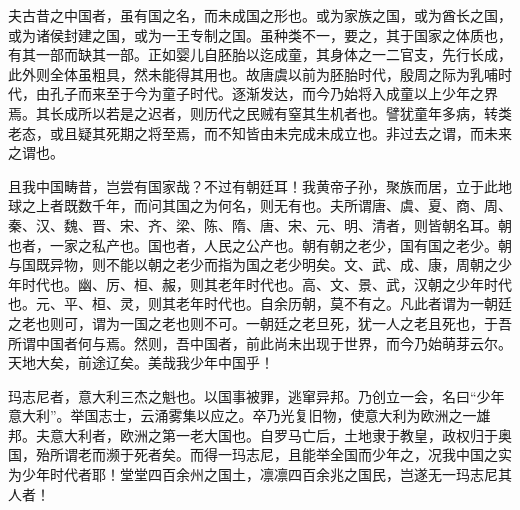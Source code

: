 \documentclass[UTF8,titlepage,oneside]{ctexbook}
\begin{document}
夫古昔之中国者，虽有国之名，而未成国之形也。或为家族之国，或为酋长之国，或为诸侯封建之国，或为一王专制之国。虽种类不一，要之，其于国家之体质也，有其一部而缺其一部。正如婴儿自胚胎以迄成童，其身体之一二官支，先行长成，此外则全体虽粗具，然未能得其用也。故唐虞以前为胚胎时代，殷周之际为乳哺时代，由孔子而来至于今为童子时代。逐渐发达，而今乃始将入成童以上少年之界焉。其长成所以若是之迟者，则历代之民贼有窒其生机者也。譬犹童年多病，转类老态，或且疑其死期之将至焉，而不知皆由未完成未成立也。非过去之谓，而未来之谓也。

且我中国畴昔，岂尝有国家哉？不过有朝廷耳！我黄帝子孙，聚族而居，立于此地球之上者既数千年，而问其国之为何名，则无有也。夫所谓唐、虞、夏、商、周、秦、汉、魏、晋、宋、齐、梁、陈、隋、唐、宋、元、明、清者，则皆朝名耳。朝也者，一家之私产也。国也者，人民之公产也。朝有朝之老少，国有国之老少。朝与国既异物，则不能以朝之老少而指为国之老少明矣。文、武、成、康，周朝之少年时代也。幽、厉、桓、赧，则其老年时代也。高、文、景、武，汉朝之少年时代也。元、平、桓、灵，则其老年时代也。自余历朝，莫不有之。凡此者谓为一朝廷之老也则可，谓为一国之老也则不可。一朝廷之老旦死，犹一人之老且死也，于吾所谓中国者何与焉。然则，吾中国者，前此尚未出现于世界，而今乃始萌芽云尔。天地大矣，前途辽矣。美哉我少年中国乎！

玛志尼者，意大利三杰之魁也。以国事被罪，逃窜异邦。乃创立一会，名曰“少年意大利”。举国志士，云涌雾集以应之。卒乃光复旧物，使意大利为欧洲之一雄邦。夫意大利者，欧洲之第一老大国也。自罗马亡后，土地隶于教皇，政权归于奥国，殆所谓老而濒于死者矣。而得一玛志尼，且能举全国而少年之，况我中国之实为少年时代者耶！堂堂四百余州之国土，凛凛四百余兆之国民，岂遂无一玛志尼其人者！
\end{document}
